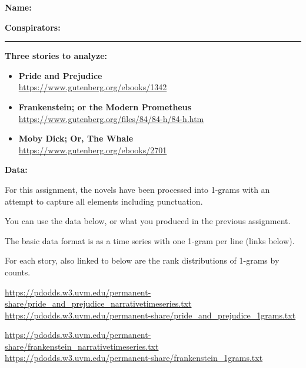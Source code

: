 \textbf{Name:} \\

\medskip

\textbf{Conspirators:} 

\medskip
\medskip

\hrule

\medskip




\assignmentsonly{\pleasesubmitprojectdraft}



\textbf{Three stories to analyze:}

\begin{itemize}
\item
  \textbf{Pride and Prejudice}\\
  \url{https://www.gutenberg.org/ebooks/1342}
\item
  \textbf{Frankenstein; or the Modern Prometheus}\\
  \url{https://www.gutenberg.org/files/84/84-h/84-h.htm}
\item
  \textbf{Moby Dick; Or, The Whale}\\
  \url{https://www.gutenberg.org/ebooks/2701}
\end{itemize}

\textbf{Data:}

For this assignment, the novels have been processed into 1-grams
with an attempt to capture all elements including punctuation.

You can use the data below, or what you produced in the previous assignment.

The basic data format is as a time series with one 1-gram per line (links below).

For each story, also linked to below are the rank distributions of 1-grams by counts.

\url{https://pdodds.w3.uvm.edu/permanent-share/pride_and_prejudice_narrativetimeseries.txt}\\
\url{https://pdodds.w3.uvm.edu/permanent-share/pride_and_prejudice_1grams.txt}

\url{https://pdodds.w3.uvm.edu/permanent-share/frankenstein_narrativetimeseries.txt}\\
\url{https://pdodds.w3.uvm.edu/permanent-share/frankenstein_1grams.txt}

